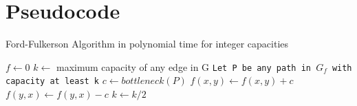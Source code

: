 \documentclass{article}
\begin{document}


\section{Pseudocode}

\begin{algorithm}
\caption{Ford-Fulkerson Algorithm in polynomial time for integer capacities}\label{euclid}
\begin{algorithmic}[1]
    \State $f \gets 0$
    \State $k \gets $ maximum capacity of any edge in G
            \State \texttt{Let P be any path in $G_{f}$ with capacity at least k} 
            \State $c \gets bottleneck(P)$ 
                    \State $f(x,y) \gets f(x,y)+c$
                \EndIf
                    \State $f(y,x) \gets f(y,x)-c$
                \EndIf
            \EndFor
        \EndWhile
        \State $k \gets k/2$
    \EndWhile
\EndProcedure
\end{algorithmic}
\end{algorithm}
\end{document}
